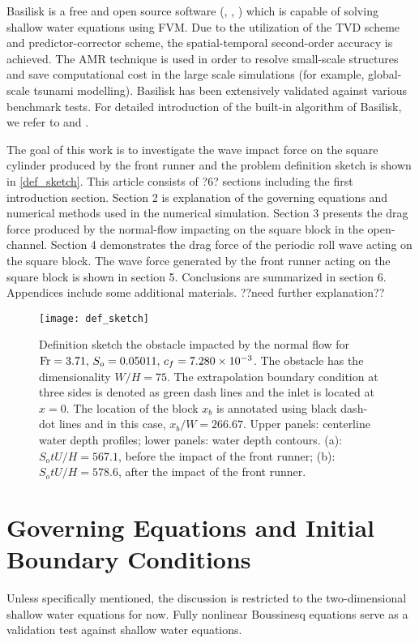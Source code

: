 \documentclass{jfm}
\newcommand{\fr}{{\rm{Fr}}}
\begin{document}
\begin{itemize}
	Basilisk is a free and open source software (\cite{Popinet2021}, \cite{Popinet2015}, \cite{Popinet2003}) which is capable of solving shallow water equations using FVM. Due to the utilization of the TVD scheme and predictor-corrector scheme, the spatial-temporal second-order accuracy is achieved. The AMR technique is used in order to resolve small-scale structures and save computational cost in the large scale simulations (for example, global-scale tsunami modelling). Basilisk has been extensively validated against various benchmark tests.  For detailed introduction of the built-in algorithm of Basilisk, we refer to \cite{Popinet2015} and \cite{Popinet2011}. 
\end{itemize}

The goal of this work is to investigate the wave impact force on the square cylinder produced by the front runner and the problem definition sketch is shown in \autoref{def_sketch}. This article consists of ?6? sections including the first introduction section.  Section 2 is explanation of the governing equations and numerical methods used in the numerical simulation. Section 3 presents the drag force produced by the normal-flow impacting on the square block in the open-channel. Section 4 demonstrates the drag force of the periodic roll wave acting on the square block. The wave force generated by the front runner acting on the square block is shown in section 5. Conclusions are summarized in section 6. Appendices include some additional materials. ??need further explanation??


\begin{figure}
	\centerline{\texttt{[image: def\_sketch]}}
	\caption{Definition sketch the obstacle impacted by the normal flow for $\fr=3.71,\,S_o=0.05011,\,c_f=7.280\times10^{-3}$. The obstacle has the dimensionality $W/H=75$. The extrapolation boundary condition at three sides is denoted as green dash lines and the inlet is located at $x=0$. The location of the block $x_b$ is annotated using black dash-dot lines and in this case, $x_b/W=266.67$. Upper panels: centerline water depth profiles; lower panels: water depth contours. (a): $S_otU/H=567.1$, before the impact of the front runner; (b): $S_otU/H=578.6$, after the impact of the front runner.}
	\label{def_sketch}
\end{figure}


\section{Governing Equations and Initial Boundary Conditions}
Unless specifically mentioned, the discussion is restricted to the two-dimensional shallow water equations for now.  Fully nonlinear Boussinesq equations serve as a validation test against shallow water equations.
\end{document}
